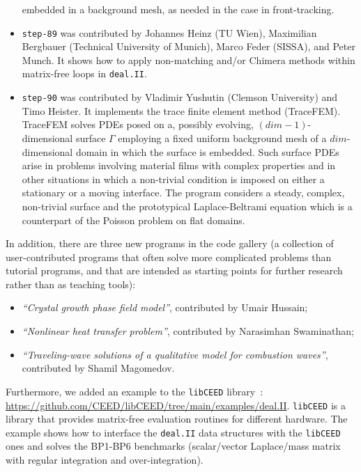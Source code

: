 \documentclass{ansarticle-preprint}
\newcommand{\specialword}[1]{\texttt{#1}}
\newcommand{\dealii}{{\specialword{deal.II}}\xspace}
\newcommand{\step}[1]{{\specialword{step-#1}}\xspace}
\begin{document}
\begin{itemize}
    embedded in a background mesh, as needed in the case in front-tracking.
  \item
    \step{89} was contributed by Johannes Heinz (TU Wien),
    Maximilian Bergbauer (Technical University of Munich),
    Marco Feder (SISSA), and Peter Munch.
    It shows how to apply non-matching and/or Chimera methods
    within matrix-free loops in \dealii.
  \item
    \step{90} was contributed by Vladimir Yushutin (Clemson University) and Timo Heister.
    It implements the trace finite element method (TraceFEM). TraceFEM solves PDEs
    posed on a, possibly evolving, $(dim-1)$-dimensional surface $\Gamma$ employing
    a fixed uniform background mesh of a $dim$-dimensional domain in which
    the surface is embedded. Such surface PDEs arise in problems involving
    material films with complex properties and in other situations in which
    a non-trivial condition is imposed on either a stationary or a moving interface.
    The program considers a steady, complex, non-trivial surface and the prototypical
    Laplace-Beltrami equation which is a counterpart of
    the Poisson problem on flat domains.
\end{itemize}

In addition, there are three new programs in the code gallery (a collection of
user-contributed programs that often solve more complicated problems
than tutorial programs, and that are intended as starting points for further
research rather than as teaching tools):
\begin{itemize}
  \item \textit{``Crystal growth phase field model''},
    contributed by Umair Hussain;
  \item \textit{``Nonlinear heat transfer problem''}, contributed by
    Narasimhan Swaminathan;
  \item \textit{``Traveling-wave solutions of a qualitative model for combustion waves''}, contributed by
    Shamil Magomedov.
\end{itemize}

Furthermore, we added an example to the \texttt{libCEED}
library~\cite{brown2021libceed}:
\url{https://github.com/CEED/libCEED/tree/main/examples/deal.II}.
\texttt{libCEED} is a library that provides matrix-free evaluation routines
for different hardware. The example shows how to interface the \dealii{}
data structures with the \texttt{libCEED} ones and solves the BP1-BP6
benchmarks (scalar/vector Laplace/mass matrix with regular integration and
over-integration).
\end{document}
